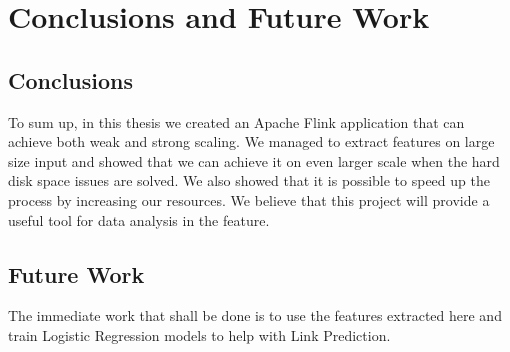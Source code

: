 \chapter{Conclusions and Future Work}

\section{Conclusions}
To sum up, in this thesis we created an Apache Flink application that can achieve both weak and strong scaling. We managed to extract features on large size input and showed that we can achieve it on even larger scale when the hard disk space issues are solved. We also showed that it is possible to speed up the process by increasing our resources.  We believe that this project will provide a useful tool for data analysis in the feature.
\section{Future Work}
The immediate work that shall be done is to use the features extracted here and train Logistic Regression models to help with Link Prediction.